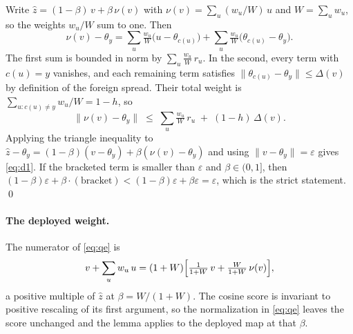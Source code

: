 Write $\hat z = (1-\beta)\, v + \beta\, \nu(v)$ with
$\nu(v) = \sum_{u} (w_u / W)\, u$ and $W = \sum_u w_u$, so the weights
$w_u / W$ sum to one. Then
\[
\nu(v) - \theta_y
= \sum_{u} \tfrac{w_u}{W} \bigl(u - \theta_{c(u)}\bigr)
+ \sum_{u} \tfrac{w_u}{W} \bigl(\theta_{c(u)} - \theta_y\bigr).
\]
The first sum is bounded in norm by
$\sum_u \tfrac{w_u}{W}\, r_u$. In the second, every term with
$c(u) = y$ vanishes, and each remaining term satisfies
$\lVert \theta_{c(u)} - \theta_y \rVert \le \Delta(v)$ by definition of
the foreign spread. Their total weight is
$\sum_{u : c(u) \neq y} w_u / W = 1 - h$, so
\[
\lVert \nu(v) - \theta_y \rVert \;\le\;
\sum_{u} \tfrac{w_u}{W}\, r_u \;+\; (1 - h)\, \Delta(v) .
\]
Applying the triangle inequality to
$\hat z - \theta_y = (1-\beta)(v - \theta_y) + \beta(\nu(v) - \theta_y)$
and using $\lVert v - \theta_y \rVert = \varepsilon$ gives
\eqref{eq:d1}. If the bracketed term is smaller than $\varepsilon$ and
$\beta \in (0, 1]$, then
$(1-\beta)\varepsilon + \beta \cdot (\text{bracket}) <
(1-\beta)\varepsilon + \beta \varepsilon = \varepsilon$, which is the
strict statement. \qed

\paragraph{The deployed weight.} The numerator of \eqref{eq:qe} is
\[
v + \sum_u w_u\, u
= (1 + W) \Bigl[ \tfrac{1}{1+W}\, v + \tfrac{W}{1+W}\, \nu(v) \Bigr] ,
\]
a positive multiple of $\hat z$ at $\beta = W / (1 + W)$. The cosine
score is invariant to positive rescaling of its first argument, so the
normalization in \eqref{eq:qe} leaves the score unchanged and the lemma
applies to the deployed map at that $\beta$.

